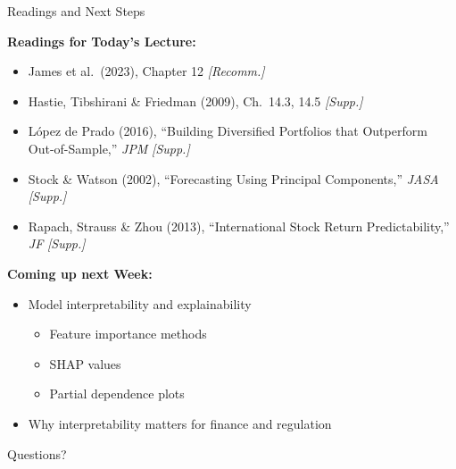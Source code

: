 \documentclass[10pt]{beamer}
\begin{document}
\begin{frame}{Readings and Next Steps}

\textbf{Readings for Today's Lecture:}
 \begin{itemize}
   \item James et al.\ (2023), Chapter 12 \hfill \textit{[Recomm.]}
   \item Hastie, Tibshirani \& Friedman (2009), Ch.\ 14.3, 14.5 \hfill \textit{[Supp.]}
    \item L\'{o}pez de Prado (2016), ``Building Diversified Portfolios that Outperform Out-of-Sample,'' \textit{JPM} \hfill \textit{[Supp.]}
    \item Stock \& Watson (2002), ``Forecasting Using Principal Components,'' \textit{JASA} \hfill \textit{[Supp.]}
    \item Rapach, Strauss \& Zhou (2013), ``International Stock Return Predictability,'' \textit{JF} \hfill \textit{[Supp.]}
  \end{itemize}

  \vspace{0.5em}
  \textbf{Coming up next Week:}
  \begin{itemize}
    \item Model interpretability and explainability
    \begin{itemize}
      \item Feature importance methods
     \item SHAP values
      \item Partial dependence plots
    \end{itemize}
    \item Why interpretability matters for finance and regulation
  \end{itemize}
\end{frame}


\begin{frame}[plain]
  \centering
  \vfill
  {\Large Questions?}
  \vfill
\end{frame}
\end{document}
